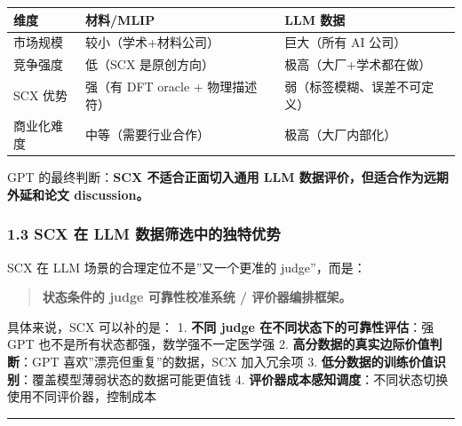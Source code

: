 \documentclass[
  12pt,
]{ctexart}
\begin{document}
\begin{longtable}[]{@{}
  >{\raggedright\arraybackslash}p{}
  >{\raggedright\arraybackslash}p{}
  >{\raggedright\arraybackslash}p{}@{}}
\toprule\noalign{}
\begin{minipage}[b]{\linewidth}\raggedright
维度
\end{minipage} & \begin{minipage}[b]{\linewidth}\raggedright
材料/MLIP
\end{minipage} & \begin{minipage}[b]{\linewidth}\raggedright
LLM 数据
\end{minipage} \\
\midrule\noalign{}
\endhead
\bottomrule\noalign{}
\endlastfoot
市场规模 & 较小（学术+材料公司） & 巨大（所有 AI 公司） \\
竞争强度 & 低（SCX 是原创方向） & 极高（大厂+学术都在做） \\
SCX 优势 & 强（有 DFT oracle + 物理描述符） &
弱（标签模糊、误差不可定义） \\
商业化难度 & 中等（需要行业合作） & 极高（大厂内部化） \\
\end{longtable}

GPT 的最终判断：\textbf{SCX 不适合正面切入通用 LLM
数据评价，但适合作为远期外延和论文 discussion。}

\subsubsection{1.3 SCX 在 LLM
数据筛选中的独特优势}\label{scx-ux5728-llm-ux6570ux636eux7b5bux9009ux4e2dux7684ux72ecux7279ux4f18ux52bf}

SCX 在 LLM 场景的合理定位不是''又一个更准的 judge''，而是：

\begin{quote}
\textbf{状态条件的 judge 可靠性校准系统 / 评价器编排框架。}
\end{quote}

具体来说，SCX 可以补的是： 1. \textbf{不同 judge
在不同状态下的可靠性评估}：强 GPT 也不是所有状态都强，数学强不一定医学强
2. \textbf{高分数据的真实边际价值判断}：GPT
喜欢''漂亮但重复''的数据，SCX 加入冗余项 3.
\textbf{低分数据的训练价值识别}：覆盖模型薄弱状态的数据可能更值钱 4.
\textbf{评价器成本感知调度}：不同状态切换使用不同评价器，控制成本

\begin{center}\rule{0.5\linewidth}{0.5pt}\end{center}
\end{document}

